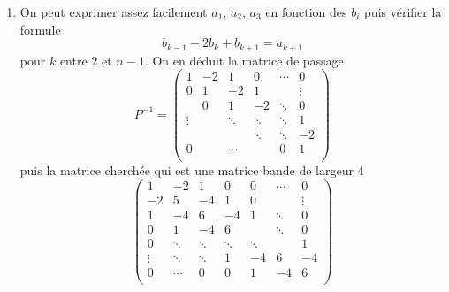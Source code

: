 \begin{enumerate}
 \item On peut exprimer assez facilement $a_1$, $a_2$, $a_3$ en fonction des $b_i$ puis vérifier la formule
\begin{displaymath}
 b_{k-1} - 2b_k +b_{k+1} = a_{k+1}
\end{displaymath}
pour $k$ entre $2$ et $n-1$. On en déduit la matrice de passage 
\begin{displaymath}
 P^{-1}=
\begin{pmatrix}
 1      & -2 & 1        & 0     & \cdots & 0   \\
 0      & 1  & -2       & 1     &        & \vdots    \\
        & 0  & 1        &-2     & \ddots & 0   \\
 \vdots &    & \ddots   &\ddots & \ddots & 1   \\
        &    &          &\ddots &\ddots  & -2  \\
 0      &    & \cdots   &       &   0    & 1   \\
\end{pmatrix}
\end{displaymath}
puis la matrice cherchée qui est une matrice bande de largeur 4
\begin{displaymath}
 \begin{pmatrix}
1      & -2     & 1      & 0      & 0      & \cdots & 0      \\
-2     & 5      & -4     & 1      & 0      &        & \vdots \\
 1     & -4     &  6     & -4     & 1      & \ddots &  0     \\
 0     &    1   & -4     &  6     &        & \ddots &  0     \\
 0     & \ddots & \ddots & \ddots & \ddots &        &  1     \\
\vdots & \ddots & \ddots &   1    &   -4   &    6   & -4     \\
 0     & \cdots &    0   &  0     & 1      &   -4   & 6      \\
 \end{pmatrix}
\end{displaymath}

\end{enumerate}
